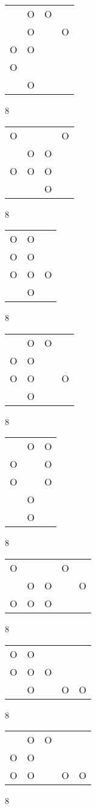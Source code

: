\begin{tabular}{|m{0.2cm}m{0.2cm}m{0.2cm}m{0.2cm}|}\hline
 &O&O& \\
 &O& &O\\
O&O& & \\
O& & & \\
 &O& & \\
\hline\end{tabular}8
\begin{tabular}{|m{0.2cm}m{0.2cm}m{0.2cm}m{0.2cm}|}\hline
O& & &O\\
 &O&O& \\
O&O&O& \\
 & &O& \\
\hline\end{tabular}8
\begin{tabular}{|m{0.2cm}m{0.2cm}m{0.2cm}|}\hline
O&O& \\
O&O& \\
O&O&O\\
 &O& \\
\hline\end{tabular}8
\begin{tabular}{|m{0.2cm}m{0.2cm}m{0.2cm}m{0.2cm}|}\hline
 &O&O& \\
O&O& & \\
O&O& &O\\
 &O& & \\
\hline\end{tabular}8
\begin{tabular}{|m{0.2cm}m{0.2cm}m{0.2cm}|}\hline
 &O&O\\
O& &O\\
O& &O\\
 &O& \\
 &O& \\
\hline\end{tabular}8
\begin{tabular}{|m{0.2cm}m{0.2cm}m{0.2cm}m{0.2cm}m{0.2cm}|}\hline
O& & &O& \\
 &O&O& &O\\
O&O&O& & \\
\hline\end{tabular}8
\begin{tabular}{|m{0.2cm}m{0.2cm}m{0.2cm}m{0.2cm}m{0.2cm}|}\hline
O&O& & & \\
O&O&O& & \\
 &O& &O&O\\
\hline\end{tabular}8
\begin{tabular}{|m{0.2cm}m{0.2cm}m{0.2cm}m{0.2cm}m{0.2cm}|}\hline
 &O&O& & \\
O&O& & & \\
O&O& &O&O\\
\hline\end{tabular}8
